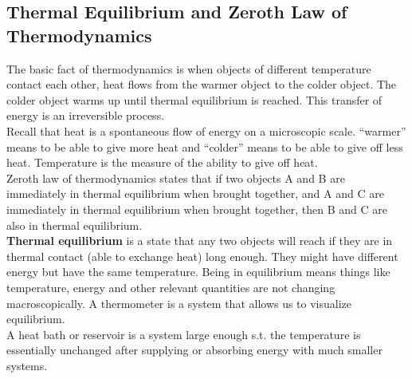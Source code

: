 \subsection{Thermal Equilibrium and Zeroth Law of Thermodynamics}

The basic fact of thermodynamics is when objects of different temperature contact each other, heat flows from the warmer object to the colder object. The colder object warms up until thermal equilibrium is reached. This transfer of energy is an irreversible process. \\

Recall that heat is a spontaneous flow of energy on a microscopic scale. ``warmer'' means to be able to give more heat and ``colder'' means to be able to give off less heat. Temperature is the measure of the ability to give off heat. \\

Zeroth law of thermodynamics states that if two objects A and B are immediately in thermal equilibrium when brought together, and A and C are immediately in thermal equilibrium when brought together, then B and C are also in thermal equilibrium. \\

\textbf{Thermal equilibrium} is a state that any two objects will reach if they are in thermal contact (able to exchange heat) long enough. They might have different energy but have the same temperature. Being in equilibrium means things like temperature, energy and other relevant quantities are not changing macroscopically. A thermometer is a system that allows us to visualize equilibrium. \\

A heat bath or reservoir is a system large enough s.t. the temperature is essentially unchanged after supplying or absorbing energy with much smaller systems. \\


